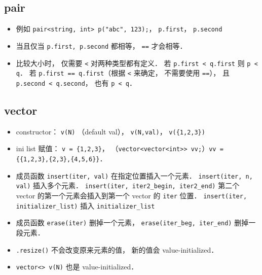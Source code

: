 
\begin{issues}
\issueDraft
\end{issues}

\subsection{pair}
\begin{itemize}
\item 例如 \verb|pair<string, int> p("abc", 123);|， \verb|p.first|， \verb|p.second|
\item 当且仅当 \verb|p.first, p.second| 都相等， \verb|==| 才会相等．
\item 比较大小时， 仅需要 \verb|<| 对两种类型都有定义． 若 \verb|p.first < q.first| 则 \verb|p < q|． 若 \verb|p.first == q.first|（根据 \verb|<| 来确定， 不需要使用 \verb|==|）， 且 \verb|p.second < q.second|， 也有 \verb|p < q|．
\end{itemize}

\subsection{vector}
\begin{itemize}
\item constructor： \verb|v(N)| （default val）， \verb|v(N,val)|， \verb|v({1,2,3})|
\item ini list 赋值： \verb|v = {1,2,3}|， （\verb|vector<vector<int>> vv;|）\verb|vv = {{1,2,3},{2,3},{4,5,6}}|．
\item 成员函数 \verb|insert(iter, val)| 在指定位置插入一个元素． \verb|insert(iter, n, val)| 插入多个元素． \verb|insert(iter, iter2_begin, iter2_end)| 第二个 vector 的第一个元素会插入到第一个 vector 的 \verb|iter| 位置． \verb|insert(iter, initializer_list)| 插入 \verb|initializer_list|
\item 成员函数 \verb|erase(iter)| 删掉一个元素， \verb|erase(iter_beg, iter_end)| 删掉一段元素．
\item \verb|.resize()| 不会改变原来元素的值， 新的值会 value-initialized．
\item \verb|vector<> v(N)| 也是 value-initialized．
\end{itemize}

